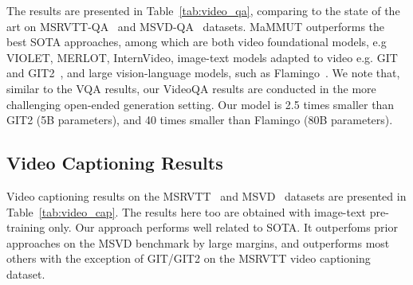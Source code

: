 \documentclass[10pt]{article} \usepackage[accepted]{tmlr}
\newcommand{\ours}{MaMMUT\xspace}
\begin{document}
The results are presented in Table~\ref{tab:video_qa}, comparing to the state of the art on MSRVTT-QA~\citep{xu2016msrvtt} and MSVD-QA~\citep{xu2017msvd-qa} datasets. \ours outperforms the best SOTA approaches, among which are both video foundational models, e.g VIOLET, MERLOT, InternVideo, image-text models adapted to video e.g. GIT and GIT2~\citep{wang2022git}, and large vision-language models, such as Flamingo~\citep{flamingo}.
We note that, similar to the VQA results, our VideoQA results are conducted in the more challenging open-ended generation setting.
Our model is 2.5 times smaller than GIT2 (5B parameters), and 40 times smaller than Flamingo (80B parameters).










\subsection{Video Captioning Results}
\label{sec:video_cap}
Video captioning results on the MSRVTT~\citep{xu2016msrvtt} and MSVD~\citep{msvd,xu2017msvd-qa} datasets are presented in Table~\ref{tab:video_cap}. 
 The results here too are obtained with image-text pre-training only. Our approach performs well related to SOTA. It outperfoms prior approaches on the MSVD benchmark by large margins, and outperforms most others with the exception of GIT/GIT2 on the MSRVTT video captioning dataset.
\end{document}
